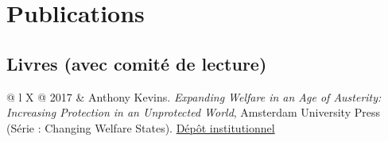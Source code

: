 \documentclass[letterpaper,fontsize=10.5pt]{scrartcl}
\begin{document}
\section{Publications}
\subsection{Livres (avec comité de lecture)}
\vspace{-2em}
\begin{longtblr}[entry=none,label=none]{@{} l X @{}}
	2017 & Anthony Kevins. \textit{Expanding Welfare in an Age of Austerity: Increasing Protection in an Unprotected World}, Amsterdam University Press (Série : Changing Welfare States). \href{https://repository.lboro.ac.uk/articles/book/Expanding_welfare_in_an_age_of_austerity_Increasing_protection_in_an_unprotected_world/9994709}{Dépôt institutionnel} \\
\end{longtblr}
\end{document}
